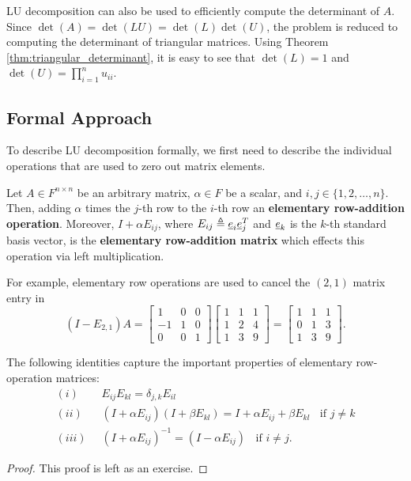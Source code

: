 LU decomposition can also be used to efficiently compute the determinant of $A$.
Since $\det(A) = \det(LU) = \det(L) \det(U)$, the problem is reduced to computing the determinant of triangular matrices.
Using Theorem \ref{thm:triangular_determinant}, it is easy to see that $\det(L) = 1$ and $\det(U) = \prod_{i=1}^n u_{ii}$.

\subsection{Formal Approach}

To describe LU decomposition formally, we first need to describe the individual operations that are used to zero out matrix elements.
\begin{definition}
Let $A \in F^{n\times n}$ be an arbitrary matrix, $\alpha \in F$ be a scalar, and $i,j\in \{1,2,\ldots,n\}$.
Then, adding $\alpha$ times the $j$-th row to the $i$-th row an \textbf{elementary row-addition operation}.
Moreover, $I + \alpha E_{ij}$, where $E_{ij} \triangleq \underline{e}_i \underline{e}_j^T$ and $\underline{e}_k$ is the $k$-th standard basis vector, is the \textbf{elementary row-addition matrix} which effects this operation via left multiplication.
\end{definition}

\begin{example}
For example, elementary row operations are used to cancel the $(2,1)$ matrix entry in
\begin{equation*}
(I - E_{2,1}) A
= \left[ \begin{array}{ccc} 1 & 0 & 0 \\ -1 & 1 & 0 \\ 0 & 0 & 1 \end{array} \right]
\left[ \begin{array}{ccc} 1 & 1 & 1 \\ 1 & 2 & 4 \\ 1 & 3 & 9 \end{array} \right]
= \left[ \begin{array}{ccc} 1 & 1 & 1 \\ 0 & 1 & 3 \\ 1 & 3 & 9 \end{array} \right].
\end{equation*}
\end{example}

\begin{lemma}
\label{lem:elem_row_mat}
The following identities capture the important properties of elementary row-operation matrices:
\begin{align*}
(i) & \;\; E_{ij} E_{kl} = \delta_{j,k} E_{il} \\
(ii) & \;\; (I + \alpha E_{ij}) (I + \beta E_{kl}) = I + \alpha E_{ij} + \beta E_{kl} \;\; \textrm{ if } j \neq k \\
(iii) & \;\; (I+ \alpha E_{ij})^{-1} = (I-\alpha E_{ij}) \;\; \textrm{ if } i \neq j. 
\end{align*}
\end{lemma}
\begin{proof}
This proof is left as an exercise.
\end{proof}


